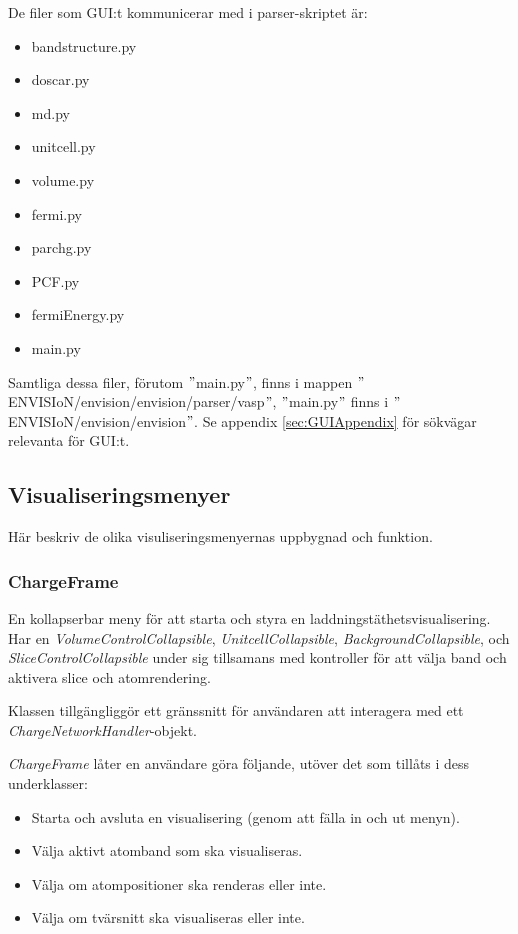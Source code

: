 De filer som GUI:t kommunicerar med i parser-skriptet är:

\begin{itemize}
    \setlength\itemsep{0em}
    \item bandstructure.py
    \item doscar.py
    \item md.py
    \item unitcell.py
    \item volume.py
    \item fermi.py
    \item parchg.py
    \item PCF.py
    \item fermiEnergy.py
    \item main.py
\end{itemize}

Samtliga dessa filer, förutom $"$main.py$"$, finns i mappen $"$ENVISIoN/envision/envision/parser/vasp$"$, $"$main.py$"$ finns i $"$ENVISIoN/envision/envision$"$. Se appendix \ref{sec:GUIAppendix} för sökvägar relevanta för GUI:t.

\subsection{Visualiseringsmenyer}
Här beskriv de olika visuliseringsmenyernas uppbygnad och funktion.

\subsubsection{ChargeFrame}
En kollapserbar meny för att starta och styra en laddningstäthetsvisualisering. Har en \textit{VolumeControlCollapsible}, \textit{UnitcellCollapsible}, \textit{BackgroundCollapsible}, och \textit{SliceControlCollapsible} under sig tillsamans med kontroller för att välja band och aktivera slice och atomrendering.

Klassen tillgängliggör ett gränssnitt för användaren att interagera med ett \textit{ChargeNetworkHandler}-objekt.

\textit{ChargeFrame} låter en användare göra följande, utöver det som tillåts i dess underklasser:
\begin{itemize}
    \setlength\itemsep{0em}
    \item Starta och avsluta en visualisering (genom att fälla in och ut menyn).
    \item Välja aktivt atomband som ska visualiseras.
    \item Välja om atompositioner ska renderas eller inte.
    \item Välja om tvärsnitt ska visualiseras eller inte.
\end{itemize}


